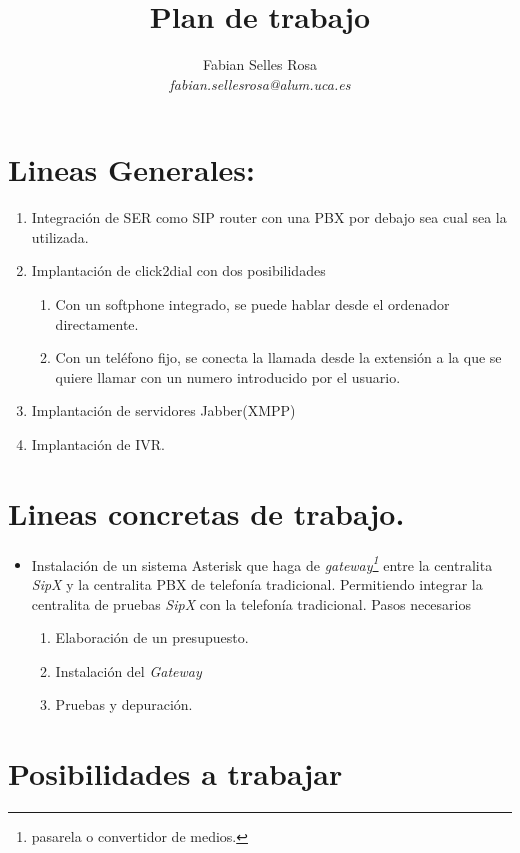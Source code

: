 \documentclass{article}
\title{Plan de trabajo}
\author{Fabian Selles Rosa \\ \emph{fabian.sellesrosa@alum.uca.es}}
\date{}
\begin{document}
\maketitle

\section{Lineas Generales:}
\begin{enumerate}
\item Integración de SER como SIP router con una PBX por debajo sea cual sea la utilizada.
\item Implantación de click2dial con dos posibilidades
  \begin{enumerate}
  \item Con un softphone integrado, se puede hablar desde el ordenador directamente.
  \item Con un teléfono fijo, se conecta la llamada desde la extensión a la que se quiere llamar con un numero introducido por el usuario.
  \end{enumerate}

\item Implantación de servidores Jabber(XMPP)

\item Implantación de IVR.
\end{enumerate}

\section{Lineas concretas de trabajo.}
\label{sec:lineas-concretas-de}

\begin{itemize}
\item Instalación de un sistema Asterisk que haga de \emph{gateway\footnote{pasarela o convertidor de medios.}} entre la centralita \emph{SipX} y la centralita PBX de telefonía tradicional. Permitiendo integrar la centralita de pruebas \emph{SipX} con la telefonía tradicional. Pasos necesarios
  \begin{enumerate}
  \item Elaboración de un presupuesto.
  \item Instalación del \emph{Gateway}
  \item Pruebas y depuración.
  \end{enumerate}
\end{itemize}

\section{Posibilidades a trabajar}
\label{sec:posib-trab}
\end{document}
